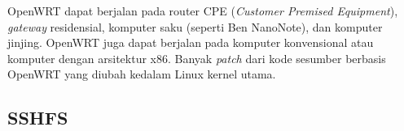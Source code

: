     OpenWRT dapat berjalan pada router CPE (\emph{Customer Premised Equipment}), \emph{gateway} residensial, komputer saku (seperti Ben NanoNote), dan komputer jinjing. OpenWRT juga dapat berjalan pada komputer konvensional atau komputer dengan arsitektur x86. Banyak \emph{patch} dari kode sesumber berbasis OpenWRT yang diubah kedalam Linux kernel utama.

  \subsection{SSHFS}
